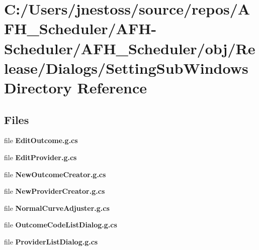 \section{C\+:/\+Users/jnestoss/source/repos/\+A\+F\+H\+\_\+\+Scheduler/\+A\+F\+H-\/\+Scheduler/\+A\+F\+H\+\_\+\+Scheduler/obj/\+Release/\+Dialogs/\+Setting\+Sub\+Windows Directory Reference}
\label{dir_48eefd47b7d3bc1e31a7d09b9b187a91}
\subsection*{Files}
\begin{DoxyCompactItemize}
\item 
file \textbf{ Edit\+Outcome.\+g.\+cs}
\item 
file \textbf{ Edit\+Provider.\+g.\+cs}
\item 
file \textbf{ New\+Outcome\+Creator.\+g.\+cs}
\item 
file \textbf{ New\+Provider\+Creator.\+g.\+cs}
\item 
file \textbf{ Normal\+Curve\+Adjuster.\+g.\+cs}
\item 
file \textbf{ Outcome\+Code\+List\+Dialog.\+g.\+cs}
\item 
file \textbf{ Provider\+List\+Dialog.\+g.\+cs}
\end{DoxyCompactItemize}
